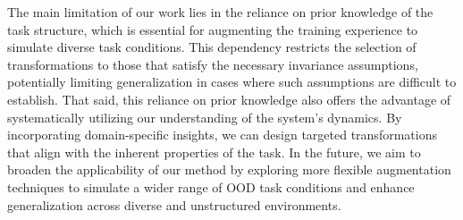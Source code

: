 The main limitation of our work lies in the reliance on prior knowledge of the task structure, which is essential for augmenting the training experience to simulate diverse task conditions. 
This dependency restricts the selection of transformations to those that satisfy the necessary invariance assumptions, potentially limiting generalization in cases where such assumptions are difficult to establish.
That said, this reliance on prior knowledge also offers the advantage of systematically utilizing our understanding of the system's dynamics. 
By incorporating domain-specific insights, we can design targeted transformations that align with the inherent properties of the task.
In the future, we aim to broaden the applicability of our method by exploring more flexible augmentation techniques to simulate a wider range of OOD task conditions and enhance generalization across diverse and unstructured environments.
